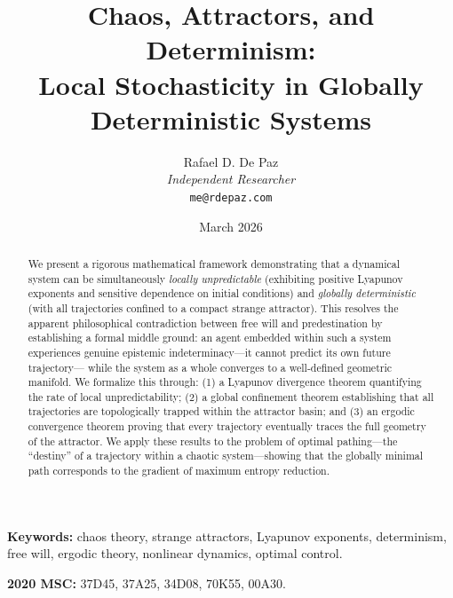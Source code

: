 \documentclass[12pt, a4paper]{article}
\theoremstyle{plain}
\theoremstyle{definition}
\theoremstyle{remark}
\begin{document}
\title{
  \textbf{Chaos, Attractors, and Determinism: \\
  Local Stochasticity in Globally \\
  Deterministic Systems}
}
\author{
  Rafael D. De Paz \\
  \textit{Independent Researcher} \\
  \texttt{me@rdepaz.com}
}
\date{March 2026}
\maketitle

\begin{abstract}
We present a rigorous mathematical framework demonstrating that a dynamical
system can be simultaneously \emph{locally unpredictable} (exhibiting
positive Lyapunov exponents and sensitive dependence on initial conditions)
and \emph{globally deterministic} (with all trajectories confined to a
compact strange attractor). This resolves the apparent philosophical
contradiction between free will and predestination by establishing a formal
middle ground: an agent embedded within such a system experiences genuine
epistemic indeterminacy---it cannot predict its own future trajectory---
while the system as a whole converges to a well-defined geometric manifold.
We formalize this through: (1) a Lyapunov divergence theorem quantifying
the rate of local unpredictability; (2) a global confinement theorem
establishing that all trajectories are topologically trapped within the
attractor basin; and (3) an ergodic convergence theorem proving that every
trajectory eventually traces the full geometry of the attractor. We apply
these results to the problem of optimal pathing---the ``destiny'' of a
trajectory within a chaotic system---showing that the globally minimal
path corresponds to the gradient of maximum entropy reduction.
\end{abstract}

\vspace{1em}
\noindent\textbf{Keywords:} chaos theory, strange attractors, Lyapunov
exponents, determinism, free will, ergodic theory, nonlinear dynamics,
optimal control.

\vspace{0.5em}
\noindent\textbf{2020 MSC:} 37D45, 37A25, 34D08, 70K55, 00A30.

\end{document}
